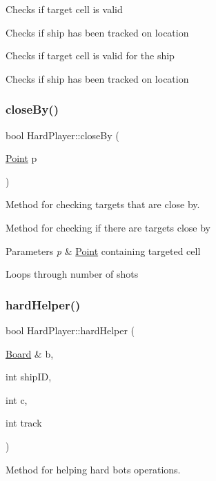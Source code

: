 Checks if target cell is valid

Checks if ship has been tracked on location

Checks if target cell is valid for the ship

Checks if ship has been tracked on location \mbox{\label{class_hard_player_a91cdd6239e111ea02bff561f6a3a0c41}} 
\subsubsection{\texorpdfstring{close\+By()}{closeBy()}}
{\footnotesize\ttfamily bool Hard\+Player\+::close\+By (\begin{DoxyParamCaption}\item[{\mbox{\hyperlink{class_point}{Point}}}]{p }\end{DoxyParamCaption})}



Method for checking target\textquotesingle{}s that are close by. 

Method for checking if there are targets close by 
\begin{DoxyParams}{Parameters}
{\em p} & \mbox{\hyperlink{class_point}{Point}} containing targeted cell \\
\hline
\end{DoxyParams}
Loops through number of shots \mbox{\label{class_hard_player_aec6ff0ed3ef8f47ac46d374cff89e6be}} 
\subsubsection{\texorpdfstring{hard\+Helper()}{hardHelper()}}
{\footnotesize\ttfamily bool Hard\+Player\+::hard\+Helper (\begin{DoxyParamCaption}\item[{\mbox{\hyperlink{class_board}{Board}} \&}]{b,  }\item[{int}]{ship\+ID,  }\item[{int}]{c,  }\item[{int}]{track }\end{DoxyParamCaption})}



Method for helping hard bot\textquotesingle{}s operations. 


